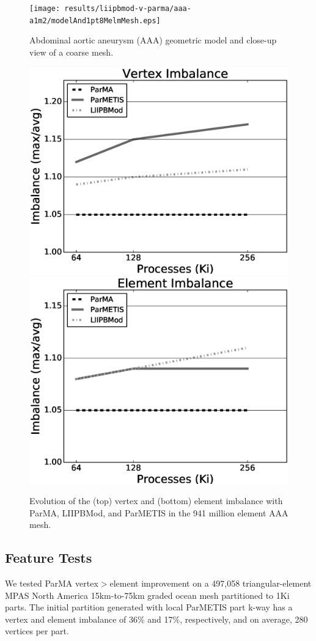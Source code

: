 \begin{figure} \centering
  \texttt{[image: results/liipbmod-v-parma/aaa-a1m2/modelAnd1pt8MelmMesh.eps]}
  \caption{
    Abdominal aortic aneurysm (AAA) geometric model and close-up view of a coarse mesh.
  }
  \label{fig:AAA}
\end{figure}

\begin{figure} \centering
  \includegraphics[width=.6\textwidth]{results/liipbmod-v-parma/vtxImb.eps}
  \includegraphics[width=.6\textwidth]{results/liipbmod-v-parma/elmImb.eps}
  \caption{
    Evolution of the (top) vertex and (bottom) element imbalance with ParMA,
    LIIPBMod, and ParMETIS in the 941 million element AAA mesh.
  }
  \label{fig:liipbmod-v-parma}
\end{figure}
\subsection{Feature Tests} \label{sec:featureTests}

We tested ParMA vertex$>$element improvement on a 497,058 triangular-element
MPAS North America 15km-to-75km graded ocean mesh partitioned to 1Ki parts.
The initial partition generated with local ParMETIS part k-way has a vertex and
element imbalance of 36\% and 17\%, respectively, and on average, 280 vertices
per part.

